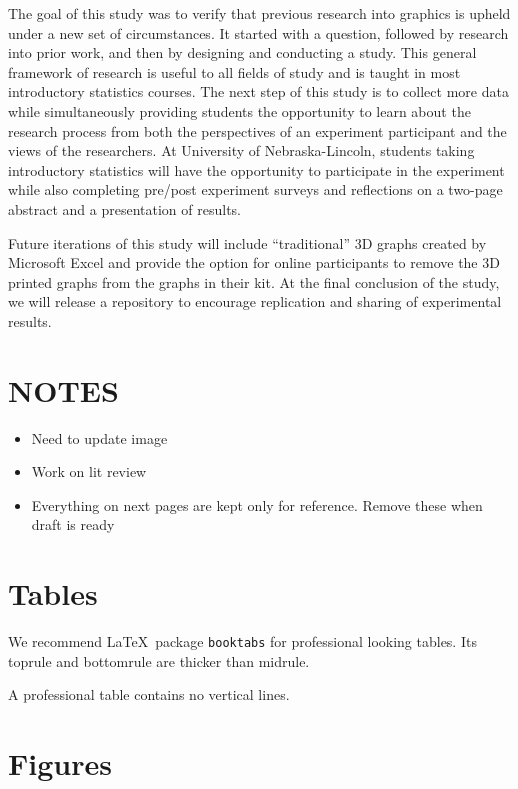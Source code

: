 \documentclass[letterpaper,inpress]{jdsart}
\begin{document}
The goal of this study was to verify that previous research into graphics is upheld under a new set of circumstances. It started with a question, followed by research into prior work, and then by designing and conducting a study. This general framework of research is useful to all fields of study and is taught in most introductory statistics courses. The next step of this study is to collect more data while simultaneously providing students the opportunity to learn about the research process from both the perspectives of an experiment participant and the views of the researchers. At University of Nebraska-Lincoln, students taking introductory statistics will have the opportunity to participate in the experiment while also completing pre/post experiment surveys and reflections on a two-page abstract and a presentation of results.

Future iterations of this study will include ``traditional'' 3D graphs created by Microsoft Excel and provide the option for online participants to remove the 3D printed graphs from the graphs in their kit. At the final conclusion of the study, we will release a repository to encourage replication and sharing of experimental results.

\newpage

\hypertarget{notes}{%
\section{NOTES}\label{notes}}

\begin{itemize}
\item
  Need to update image
\item
  Work on lit review
\item
  Everything on next pages are kept only for reference. Remove these when draft is ready
\end{itemize}

\newpage

\hypertarget{tables}{%
\section{Tables}\label{tables}}

We recommend \LaTeX~package \texttt{booktabs} for professional
looking tables. Its toprule and bottomrule are thicker than midrule.

A professional table contains no vertical lines.

\hypertarget{figures}{%
\section{Figures}\label{figures}}
\end{document}

